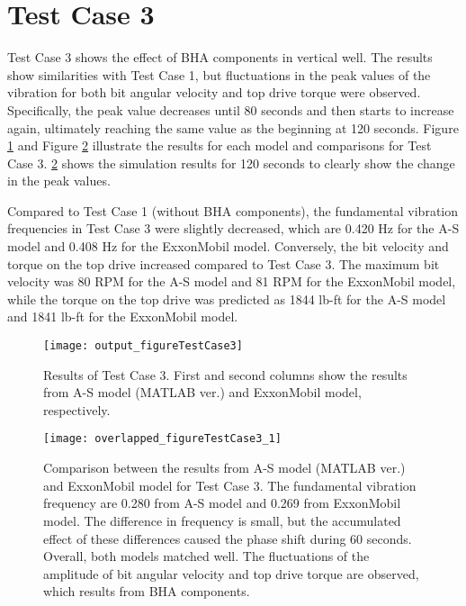 \section{Test Case 3}
Test Case 3 shows the effect of BHA components in vertical well. The results show similarities with Test Case 1, but fluctuations in the peak values of the vibration for both bit angular velocity and top drive torque were observed. Specifically, the peak value decreases until 80 seconds and then starts to increase again, ultimately reaching the same value as the beginning at 120 seconds. Figure \ref{figure_testcase3} and Figure \ref{figure_testcase3_overlapped} illustrate the results for each model and comparisons for Test Case 3. \ref{figure_testcase3_overlapped} shows the simulation results for 120 seconds to clearly show the change in the peak values.

Compared to Test Case 1 (without BHA components), the fundamental vibration frequencies in Test Case 3 were slightly decreased, which are 0.420 Hz for the A-S model and 0.408 Hz for the ExxonMobil model. Conversely, the bit velocity and torque on the top drive increased compared to Test Case 3. The maximum bit velocity was 80 RPM for the A-S model and 81 RPM for the ExxonMobil model, while the torque on the top drive was predicted as 1844 lb-ft for the A-S model and 1841 lb-ft for the ExxonMobil model. 

\begin{figure}
  \centering
  \texttt{[image: output\_figureTestCase3]}
  \caption[Results of Test Case 3]{Results of Test Case 3. First and second columns show the results from A-S model (MATLAB ver.) and ExxonMobil model, respectively.}\label{figure_testcase3}
\end{figure}
\begin{figure}
  \centering
  \texttt{[image: overlapped\_figureTestCase3\_1]}
  \caption[Comparison of the results for Test Case 3]{Comparison between the results from A-S model (MATLAB ver.) and ExxonMobil model for Test Case 3. The fundamental vibration frequency are 0.280 from A-S model and 0.269 from ExxonMobil model. The difference in frequency is small, but the accumulated effect of these differences caused the phase shift during 60 seconds. Overall, both models matched well. The fluctuations of the amplitude of bit angular velocity and top drive torque are observed, which results from BHA components.}\label{figure_testcase3_overlapped}
\end{figure}

